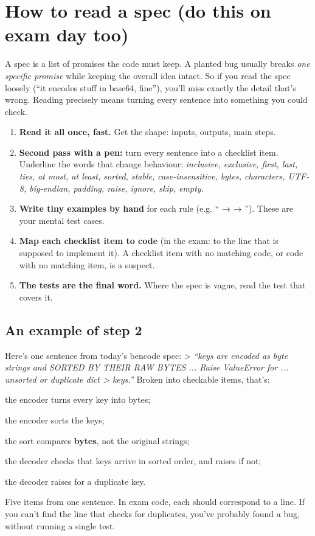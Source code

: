 \documentclass[10pt,a4paper]{article}
\begin{document}
\section{How to read a spec (do this on exam day too)}
A spec is a list of promises the code must keep. A planted bug usually breaks \emph{one specific promise} while keeping the overall idea intact. So if you read the spec loosely (“it encodes stuff in base64, fine”), you’ll miss exactly the detail that’s wrong. Reading precisely means turning every sentence into something you could check.
\begin{enumerate}
\item \textbf{Read it all once, fast.} Get the shape: inputs, outputs, main steps.
\item \textbf{Second pass with a pen:} turn every sentence into a checklist item. Underline the words that change behaviour: \emph{inclusive, exclusive, first, last, ties, at most, at least, sorted, stable, case-insensitive, bytes, characters, UTF-8, big-endian, padding, raise, ignore, skip, empty}.
\item \textbf{Write tiny examples by hand} for each rule (e.g. “ →  → ”). These are your mental test cases.
\item \textbf{Map each checklist item to code} (in the exam: to the line that is supposed to implement it). A checklist item with no matching code, or code with no matching item, is a suspect.
\item \textbf{The tests are the final word.} Where the spec is vague, read the test that covers it.
\end{enumerate}
\subsection{An example of step 2}
Here’s one sentence from today’s bencode spec:
\textgreater{} \emph{“keys are encoded as byte strings and SORTED BY THEIR RAW BYTES ... Raise ValueError for ... unsorted or duplicate dict \textgreater{} keys.”}
Broken into checkable items, that’s:
\begin{checklist}
\item the encoder turns every key into bytes;
\item the encoder sorts the keys;
\item the sort compares \textbf{bytes}, not the original strings;
\item the decoder checks that keys arrive in sorted order, and raises  if not;
\item the decoder raises  for a duplicate key.
\end{checklist}
Five items from one sentence. In exam code, each should correspond to a line. If you can’t find the line that checks for duplicates, you’ve probably found a bug, without running a single test.
\setcounter{section}{1}
\end{document}
